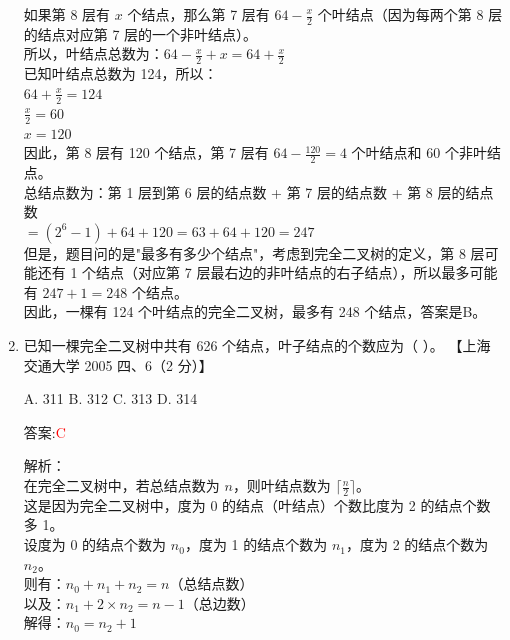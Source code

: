 \documentclass[lang=cn,newtx,10pt,scheme=chinese]{../../../elegantbook}
\begin{document}
\begin{enumerate}
    如果第 8 层有 $x$ 个结点，那么第 7 层有 $64 - \frac{x}{2}$ 个叶结点（因为每两个第 8 层的结点对应第 7 层的一个非叶结点）。\\
    
    所以，叶结点总数为：$64 - \frac{x}{2} + x = 64 + \frac{x}{2}$\\
    
    已知叶结点总数为 124，所以：\\
    $64 + \frac{x}{2} = 124$\\
    $\frac{x}{2} = 60$\\
    $x = 120$\\
    
    因此，第 8 层有 120 个结点，第 7 层有 $64 - \frac{120}{2} = 4$ 个叶结点和 60 个非叶结点。\\
    
    总结点数为：第 1 层到第 6 层的结点数 + 第 7 层的结点数 + 第 8 层的结点数\\
    $= (2^6 - 1) + 64 + 120 = 63 + 64 + 120 = 247$\\
    
    但是，题目问的是"最多有多少个结点"，考虑到完全二叉树的定义，第 8 层可能还有 1 个结点（对应第 7 层最右边的非叶结点的右子结点），所以最多可能有 $247 + 1 = 248$ 个结点。\\
    
    因此，一棵有 124 个叶结点的完全二叉树，最多有 248 个结点，答案是B。\\  

    \item 已知一棵完全二叉树中共有 626 个结点，叶子结点的个数应为（ ）。  
    【上海交通大学 2005 四、6（2 分）】  

    A. 311 \quad B. 312 \quad C. 313 \quad D. 314  
    
    答案:\textcolor{red}{C}
    
    解析：\\
    在完全二叉树中，若总结点数为 $n$，则叶结点数为 $\lceil \frac{n}{2} \rceil$。\\
    
    这是因为完全二叉树中，度为 0 的结点（叶结点）个数比度为 2 的结点个数多 1。\\
    设度为 0 的结点个数为 $n_0$，度为 1 的结点个数为 $n_1$，度为 2 的结点个数为 $n_2$。\\
    则有：$n_0 + n_1 + n_2 = n$（总结点数）\\
    以及：$n_1 + 2 \times n_2 = n - 1$（总边数）\\
    
    解得：$n_0 = n_2 + 1$\\
    

\end{enumerate}
\end{document}
